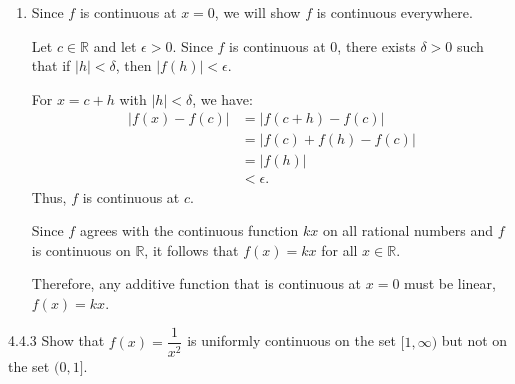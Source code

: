 {\begin{enumerate}
              Now, observe that for \(p,q \in \Z\) with \(q \ne 0\), we have:
              \[
                  f\left(\underbrace{\dfrac{p}{q} + \dfrac{p}{q} + \cdots + \dfrac{p}{q}}_{q\text{ times}}\right) = f(p).
              \]
              Similarly, by the additive condition (\(q\) times on each side):
              \[
                  f\left(\dfrac{p}{q} + \dfrac{p}{q} + \cdots + \dfrac{p}{q}\right) = f\left(\dfrac{p}{q}\right) + f\left(\dfrac{p}{q}\right) + \cdots + f\left(\dfrac{p}{q}\right).
              \]
              This is equivalent to:
              \[
                  q \cdot f\left(\dfrac{p}{q}\right) = f(p).
              \]
              Therefore,
              \[
                  f\left(\dfrac{p}{q}\right) = \dfrac{1}{q} f(p)
              \]
              Putting everything together, we let \(r = \dfrac{p}{q}\). Then,
              \begin{align*}
                  f\left( \dfrac{p}{q} \right) & = \dfrac{1}{q} f(p)                         \\
                                               & = \dfrac{1}{q} (kp) \quad (\text{from (1)}) \\
                                               & = k \left( \dfrac{p}{q} \right)             \\
                  f(r)                         & = kr.
              \end{align*}
              Thus, \(f(r) = kr\) for any rational number \(r\).
        \item Since \(f\) is continuous at \(x = 0\), we will show \(f\) is continuous everywhere.

              Let \(c \in \mathbb{R}\) and let \(\epsilon > 0\). Since \(f\) is continuous at \(0\), there exists \(\delta > 0\) such that if \(|h| < \delta\), then \(|f(h)| < \epsilon\).

              For \(x = c + h\) with \(|h| < \delta\), we have:
              \begin{align*}
                  |f(x) - f(c)| & = |f(c + h) - f(c)|    \\
                                & = |f(c) + f(h) - f(c)| \\
                                & = |f(h)|               \\
                                & < \epsilon.
              \end{align*}
              Thus, \(f\) is continuous at \(c\).

              Since \(f\) agrees with the continuous function \(kx\) on all rational numbers and \(f\) is continuous on \(\mathbb{R}\), it follows that \(f(x) = kx\) for all \(x \in \mathbb{R}\).

              Therefore, any additive function that is continuous at \(x = 0\) must be linear, \(f(x) = kx\).
    \end{enumerate}
}
\newpage
\begin{exercise}
    {4.4.3} Show that \(f(x) = \dfrac{1}{x^2}\) is uniformly continuous on the set \([1, \infty)\) but not on the set \((0, 1]\).
\end{exercise}

